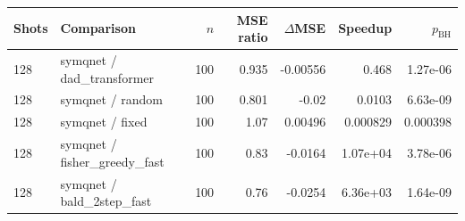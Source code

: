 \begin{tabular}{llrrrrr}
\toprule
Shots & Comparison & $n$ & MSE ratio & $\Delta$MSE & Speedup & $p_{\mathrm{BH}}$ \\
\midrule
128 & symqnet / dad\_transformer & 100 & 0.935 & -0.00556 & 0.468 & 1.27e-06 \\
128 & symqnet / random & 100 & 0.801 & -0.02 & 0.0103 & 6.63e-09 \\
128 & symqnet / fixed & 100 & 1.07 & 0.00496 & 0.000829 & 0.000398 \\
128 & symqnet / fisher\_greedy\_fast & 100 & 0.83 & -0.0164 & 1.07e+04 & 3.78e-06 \\
128 & symqnet / bald\_2step\_fast & 100 & 0.76 & -0.0254 & 6.36e+03 & 1.64e-09 \\
\bottomrule
\end{tabular}
